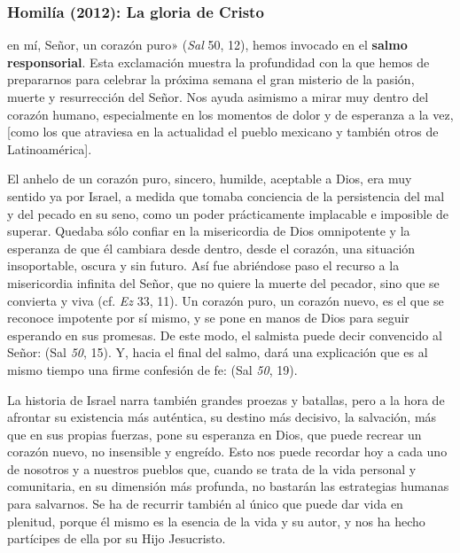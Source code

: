 \newpage

\subsubsection{Homilía (2012): La gloria de Cristo}


\begin{body}
 en mí, Señor, un corazón puro» (\textit{Sal} 50, 12), hemos invocado en el \textbf{salmo responsorial}. Esta exclamación muestra la profundidad con la que hemos de prepararnos para celebrar la próxima semana el gran misterio de la pasión, muerte y resurrección del Señor. Nos ayuda asimismo a mirar muy dentro del corazón humano, especialmente en los momentos de dolor y de esperanza a la vez, [como los que atraviesa en la actualidad el pueblo mexicano y también otros de Latinoamérica].

El anhelo de un corazón puro, sincero, humilde, aceptable a Dios, era muy sentido ya por Israel, a medida que tomaba conciencia de la persistencia del mal y del pecado en su seno, como un poder prácticamente implacable e imposible de superar. Quedaba sólo confiar en la misericordia de Dios omnipotente y la esperanza de que él cambiara desde dentro, desde el corazón, una situación insoportable, oscura y sin futuro. Así fue abriéndose paso el recurso a la misericordia infinita del Señor, que no quiere la muerte del pecador, sino que se convierta y viva (cf. \textit{Ez} 33, 11). Un corazón puro, un corazón nuevo, es el que se reconoce impotente por sí mismo, y se pone en manos de Dios para seguir esperando en sus promesas. De este modo, el salmista puede decir convencido al Señor:  (Sal \textit{50}, 15). Y, hacia el final del salmo, dará una explicación que es al mismo tiempo una firme confesión de fe:  (Sal \textit{50}, 19).

La historia de Israel narra también grandes proezas y batallas, pero a la hora de afrontar su existencia más auténtica, su destino más decisivo, la salvación, más que en sus propias fuerzas, pone su esperanza en Dios, que puede recrear un corazón nuevo, no insensible y engreído. Esto nos puede recordar hoy a cada uno de nosotros y a nuestros pueblos que, cuando se trata de la vida personal y comunitaria, en su dimensión más profunda, no bastarán las estrategias humanas para salvarnos. Se ha de recurrir también al único que puede dar vida en plenitud, porque él mismo es la esencia de la vida y su autor, y nos ha hecho partícipes de ella por su Hijo Jesucristo.


\end{body}
